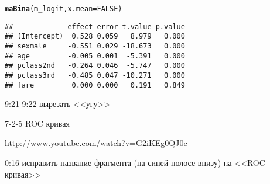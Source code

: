 \documentclass[12pt,a4paper]{article}\usepackage[]{graphicx}\usepackage[]{color}
\makeatletter
\newcommand{\hlnum}[1]{\textcolor[rgb]{0.686,0.059,0.569}{#1}}%
\newcommand{\hlstd}[1]{\textcolor[rgb]{0.345,0.345,0.345}{#1}}%
\newcommand{\hlkwc}[1]{\textcolor[rgb]{0.333,0.667,0.333}{#1}}%
\newcommand{\hlkwd}[1]{\textcolor[rgb]{0.737,0.353,0.396}{\textbf{#1}}}%
\newenvironment{kframe}{%
 \def\at@end@of@kframe{}%
 \ifinner\ifhmode%
  \def\at@end@of@kframe{\end{minipage}}%
  \begin{minipage}{\columnwidth}%
 \fi\fi%
 \def\FrameCommand##1{\hskip\@totalleftmargin \hskip-\fboxsep
 \colorbox{shadecolor}{##1}\hskip-\fboxsep
     \hskip-\linewidth \hskip-\@totalleftmargin \hskip\columnwidth}%
 \MakeFramed {\advance\hsize-\width
   \@totalleftmargin\z@ \linewidth\hsize
   \@setminipage}}%
 {\par\unskip\endMakeFramed%
 \at@end@of@kframe}
\newenvironment{knitrout}{}{} %
\makeatother
\begin{document}
\begin{knitrout}
\color{fgcolor}\begin{kframe}
\begin{alltt}
\hlkwd{maBina}\hlstd{(m_logit,}\hlkwc{x.mean} \hlstd{=} \hlnum{FALSE}\hlstd{)}
\end{alltt}
\begin{verbatim}
##             effect error t.value p.value
## (Intercept)  0.528 0.059   8.979   0.000
## sexmale     -0.551 0.029 -18.673   0.000
## age         -0.005 0.001  -5.391   0.000
## pclass2nd   -0.264 0.046  -5.747   0.000
## pclass3rd   -0.485 0.047 -10.271   0.000
## fare         0.000 0.000   0.191   0.849
\end{verbatim}
\end{kframe}
\end{knitrout}

9:21-9:22 вырезать <<угу>>

7-2-5 ROC кривая

\url{http://www.youtube.com/watch?v=G2iKEg0QJ0c}

0:16 исправить название фрагмента (на синей полосе внизу) на <<ROC кривая>>
\end{document}
